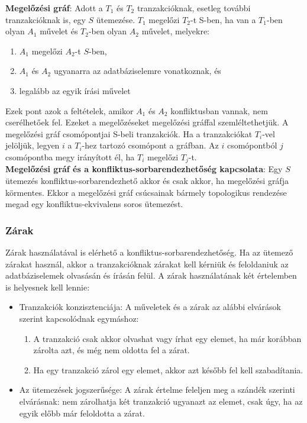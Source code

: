 \documentclass[margin=0px]{article}
\begin{document}
\noindent \textbf{Megelőzési gráf}: Adott a $T_{1}$ és $T_{2}$ tranzakcióknak, esetleg további tranzakcióknak is, egy $S$ ütemezése.
$T_{1}$ megelőzi $T_{2}$-t S-ben, ha van a $T_{1}$-ben olyan $A_{1}$ művelet és $T_{2}$-ben olyan $A_{2}$ művelet, melyekre:
\begin{enumerate}
    \item	$A_{1}$ megelőzi $A_{2}$-t $S$-ben,
    \item	$A_{1}$ és $A_{2}$ ugyanarra az adatbáziselemre vonatkoznak, és
    \item	legalább az egyik írási művelet
\end{enumerate}
Ezek pont azok a feltételek, amikor $A_{1}$ és $A_{2}$ konfliktusban vannak, nem cserélhetőek fel. Ezeket a megelőzéseket megelőzési
gráffal szemléltethetjük. A megelőzési gráf csomópontjai S-beli tranzakciók. Ha a tranzakciókat $T_{i}$-vel jelöljük, legyen $i$
a $T_{i}$-hez tartozó csomópont a gráfban. Az $i$ csomópontból $j$ csomópontba megy irányított él, ha $T_{i}$ megelőzi $T_{j}$-t.\\

\noindent \textbf{Megelőzési gráf és a konfliktus-sorbarendezhetőség kapcsolata}: Egy $S$ ütemezés konfliktus-sorbarendezhető
akkor és csak akkor, ha megelőzési gráfja körmentes. Ekkor a megelőzési gráf csúcsainak bármely topologikus rendezése megad
egy konfliktus-ekvivalens soros ütemezést.

\subsubsection{Zárak}

Zárak használatával is elérhető a konfliktus-sorbarendezhetőség. Ha az ütemező zárakat használ, akkor a tranzakcióknak zárakat
kell kérniük és feloldaniuk az adatbáziselemek olvasásán és írásán felül. A zárak használatának két értelemben is helyesnek kell
lennie:

\begin{itemize}
    \item	Tranzakciók konzisztenciája: A műveletek és a zárak az alábbi elvárások szerint kapcsolódnak egymáshoz:
          \begin{enumerate}
              \item	A tranzakció csak akkor olvashat vagy írhat egy elemet, ha már korábban zárolta azt, és még nem oldotta
                    fel a zárat.

              \item	Ha egy tranzakció zárol egy elemet, akkor azt később fel kell szabadítania.
          \end{enumerate}

    \item	Az ütemezések jogszerűsége: A zárak értelme feleljen meg a szándék szerinti elvárásnak: nem zárolhatja két tranzakció
          ugyanazt az elemet, csak úgy, ha az egyik előbb már feloldotta a zárat.
\end{itemize}
\end{document}
